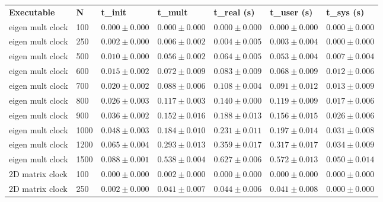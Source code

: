 \begin{table}[h!]   
    \centering
    \begin{tabular}{|l|l|l|l|l|l|}    
        \hline
        \textbf{Executable} & \textbf{N}& \textbf{t_init}     & \textbf{t_mult}     & \textbf{t\_real (s)}  & \textbf{t\_user (s)}    & \textbf{t\_sys (s)} \\
        eigen mult clock    & 100       & \(0.000 \pm 0.000\) & \(0.000 \pm 0.000\) & \(0.000 \pm 0.000\) & \(0.000 \pm 0.000\) & \(0.000 \pm 0.000\) \\
        eigen mult clock    & 250       & \(0.002 \pm 0.000\) & \(0.006 \pm 0.002\) & \(0.004 \pm 0.005\) & \(0.003 \pm 0.004\) & \(0.000 \pm 0.000\) \\
        eigen mult clock    & 500       & \(0.010 \pm 0.000\) & \(0.056 \pm 0.002\) & \(0.064 \pm 0.005\) & \(0.053 \pm 0.004\) & \(0.007 \pm 0.004\) \\
        eigen mult clock    & 600       & \(0.015 \pm 0.002\) & \(0.072 \pm 0.009\) & \(0.083 \pm 0.009\) & \(0.068 \pm 0.009\) & \(0.012 \pm 0.006\) \\
        eigen mult clock    & 700       & \(0.020 \pm 0.002\) & \(0.088 \pm 0.006\) & \(0.108 \pm 0.004\) & \(0.091 \pm 0.012\) & \(0.013 \pm 0.009\) \\
        eigen mult clock    & 800       & \(0.026 \pm 0.003\) & \(0.117 \pm 0.003\) & \(0.140 \pm 0.000\) & \(0.119 \pm 0.009\) & \(0.017 \pm 0.006\) \\
        eigen mult clock    & 900       & \(0.036 \pm 0.002\) & \(0.152 \pm 0.016\) & \(0.188 \pm 0.013\) & \(0.156 \pm 0.015\) & \(0.026 \pm 0.006\) \\
        eigen mult clock    & 1000      & \(0.048 \pm 0.003\) & \(0.184 \pm 0.010\) & \(0.231 \pm 0.011\) & \(0.197 \pm 0.014\) & \(0.031 \pm 0.008\) \\
        eigen mult clock    & 1200      & \(0.065 \pm 0.004\) & \(0.293 \pm 0.013\) & \(0.359 \pm 0.017\) & \(0.317 \pm 0.017\) & \(0.034 \pm 0.009\) \\
        eigen mult clock    & 1500      & \(0.088 \pm 0.001\) & \(0.538 \pm 0.004\) & \(0.627 \pm 0.006\) & \(0.572 \pm 0.013\) & \(0.050 \pm 0.014\) \\
        2D matrix clock     & 100       & \(0.000 \pm 0.000\) & \(0.002 \pm 0.000\) & \(0.000 \pm 0.000\) & \(0.000 \pm 0.000\) & \(0.000 \pm 0.000\) \\
        2D matrix clock     & 250       & \(0.002 \pm 0.000\) & \(0.041 \pm 0.007\) & \(0.044 \pm 0.006\) & \(0.041 \pm 0.008\) & \(0.000 \pm 0.000\) \\

\end{tabular}
\end{table}

